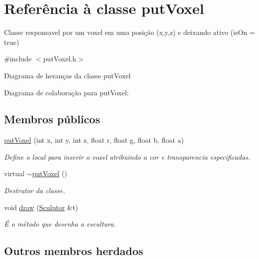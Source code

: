 \hypertarget{classput_voxel}{}\section{Referência à classe put\+Voxel}
\label{classput_voxel}


Classe responsavel por um voxel em uma posição (x,y,z) e deixando ativo (is\+On = true)  




{\ttfamily \#include $<$put\+Voxel.\+h$>$}



Diagrama de heranças da classe put\+Voxel


Diagrama de colaboração para put\+Voxel\+:
\subsection*{Membros públicos}
\begin{DoxyCompactItemize}
\item 
\hyperlink{classput_voxel_a598024389450f9df8dd1dc1c221c9d03}{put\+Voxel} (int x, int y, int z, float r, float g, float b, float a)
\begin{DoxyCompactList}\small\item\em Define o local para inserir o voxel atribuindo a cor e transparencia especificadas. \end{DoxyCompactList}\item 
\mbox{\label{classput_voxel_a700c0dd70550a98f5da63e53ee76e186}} 
virtual \hyperlink{classput_voxel_a700c0dd70550a98f5da63e53ee76e186}{$\sim$put\+Voxel} ()
\begin{DoxyCompactList}\small\item\em Destrutor da classe. \end{DoxyCompactList}\item 
void \hyperlink{classput_voxel_a39ae3ee4db405543234953f503201429}{draw} (\hyperlink{class_sculptor}{Sculptor} \&t)
\begin{DoxyCompactList}\small\item\em É o método que desenha a escultura. \end{DoxyCompactList}\end{DoxyCompactItemize}
\subsection*{Outros membros herdados}


